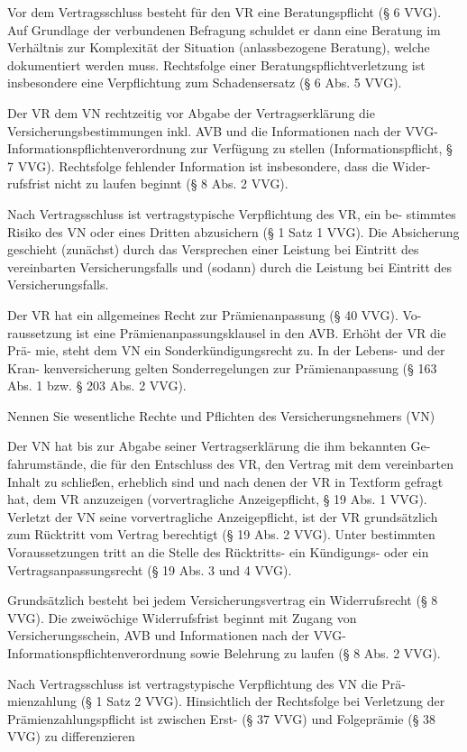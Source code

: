 Vor dem Vertragsschluss besteht für den VR eine Beratungspflicht (§ 6 VVG). 
Auf Grundlage der verbundenen Befragung schuldet er dann eine Beratung im 
Verhältnis zur Komplexität der Situation (anlassbezogene Beratung), welche dokumentiert werden muss.
Rechtsfolge einer Beratungspflichtverletzung ist insbesondere eine Verpflichtung 
zum Schadensersatz (§ 6 Abs. 5 VVG).

Der VR dem VN rechtzeitig vor Abgabe der Vertragserklärung
die Versicherungsbestimmungen inkl. AVB und die Informationen nach der VVG-
Informationspflichtenverordnung zur Verfügung zu stellen (Informationspflicht,
§ 7 VVG). Rechtsfolge fehlender Information ist insbesondere, dass die Wider-
rufsfrist nicht zu laufen beginnt (§ 8 Abs. 2 VVG).

Nach Vertragsschluss ist vertragstypische Verpflichtung des VR, ein be-
stimmtes Risiko des VN oder eines Dritten abzusichern (§ 1 Satz 1 VVG). Die
Absicherung geschieht (zunächst) durch das Versprechen einer Leistung bei Eintritt
des vereinbarten Versicherungsfalls und (sodann) durch die Leistung bei Eintritt
des Versicherungsfalls.

Der VR hat ein allgemeines Recht zur Prämienanpassung (§ 40 VVG). Vo-
raussetzung ist eine Prämienanpassungsklausel in den AVB. Erhöht der VR die Prä-
mie, steht dem VN ein Sonderkündigungsrecht zu. In der Lebens- und der Kran-
kenversicherung gelten Sonderregelungen zur Prämienanpassung (§ 163 Abs. 1
bzw. § 203 Abs. 2 VVG).

Nennen Sie wesentliche Rechte und Pflichten des Versicherungsnehmers (VN)

Der VN hat bis zur Abgabe seiner Vertragserklärung die ihm bekannten Ge-
fahrumstände, die für den Entschluss des VR, den Vertrag mit dem vereinbarten
Inhalt zu schließen, erheblich sind und nach denen der VR in Textform gefragt hat,
dem VR anzuzeigen (vorvertragliche Anzeigepflicht, § 19 Abs. 1 VVG).
Verletzt der VN seine vorvertragliche Anzeigepflicht, ist der VR grundsätzlich zum Rücktritt vom Vertrag
berechtigt (§ 19 Abs. 2 VVG). Unter bestimmten Voraussetzungen tritt an die Stelle
des Rücktritts- ein Kündigungs- oder ein Vertragsanpassungsrecht (§ 19 Abs. 3 und 4 VVG).


Grundsätzlich besteht bei jedem Versicherungsvertrag ein Widerrufsrecht
(§ 8 VVG). Die zweiwöchige Widerrufsfrist beginnt mit Zugang von Versicherungsschein, 
AVB und Informationen nach der VVG-Informationspflichtenverordnung sowie 
Belehrung zu laufen (§ 8 Abs. 2 VVG).

Nach Vertragsschluss ist vertragstypische Verpflichtung des VN die Prä-
mienzahlung (§ 1 Satz 2 VVG).
Hinsichtlich der Rechtsfolge bei Verletzung der Prämienzahlungspflicht ist zwischen
Erst- (§ 37 VVG) und Folgeprämie (§ 38 VVG) zu differenzieren

